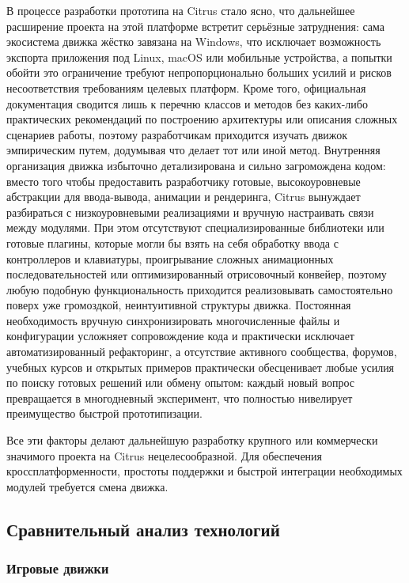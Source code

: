         В процессе разработки прототипа на Citrus стало ясно, что дальнейшее расширение проекта на этой платформе встретит серьёзные затруднения: сама экосистема движка жёстко завязана на Windows, что исключает возможность экспорта приложения под Linux, macOS или мобильные устройства, а попытки обойти это ограничение требуют непропорционально больших усилий и рисков несоответствия требованиям целевых платформ. Кроме того, официальная документация сводится лишь к перечню классов и методов без каких-либо практических рекомендаций по построению архитектуры или описания сложных сценариев работы, поэтому разработчикам приходится изучать движок эмпирическим путем, додумывая что делает тот или иной метод. Внутренняя организация движка избыточно детализирована и сильно загромождена кодом: вместо того чтобы предоставить разработчику готовые, высокоуровневые абстракции для ввода-вывода, анимации и рендеринга, Citrus вынуждает разбираться с низкоуровневыми реализациями и вручную настраивать связи между модулями. При этом отсутствуют специализированные библиотеки или готовые плагины, которые могли бы взять на себя обработку ввода с контроллеров и клавиатуры, проигрывание сложных анимационных последовательностей или оптимизированный отрисовочный конвейер, поэтому любую подобную функциональность приходится реализовывать самостоятельно поверх уже громоздкой, неинтуитивной структуры движка. Постоянная необходимость вручную синхронизировать многочисленные файлы и конфигурации усложняет сопровождение кода и практически исключает автоматизированный рефакторинг, а отсутствие активного сообщества, форумов, учебных курсов и открытых примеров практически обесценивает любые усилия по поиску готовых решений или обмену опытом: каждый новый вопрос превращается в многодневный эксперимент, что полностью нивелирует преимущество быстрой прототипизации.

        Все эти факторы делают дальнейшую разработку крупного или коммерчески значимого проекта на Citrus нецелесообразной. Для обеспечения кроссплатформенности, простоты поддержки и быстрой интеграции необходимых модулей требуется смена движка.

    \subsection{Сравнительный анализ технологий}

        \subsubsection{Игровые движки}

